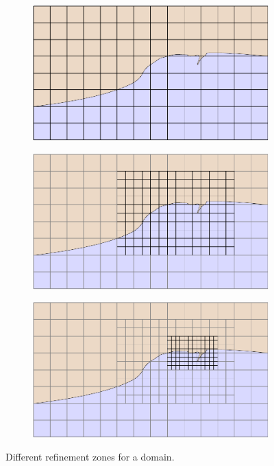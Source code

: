 \begin{figure}
\centering
\begin{subfigure}{.8\textwidth}
    \includegraphics[width=\textwidth]{img/multigrid/grid1.pdf}
    \vspace{1em}
\end{subfigure}
\begin{subfigure}{.8\textwidth}
    \includegraphics[width=\textwidth]{img/multigrid/grid2.pdf}
    \vspace{1em}
\end{subfigure}
\begin{subfigure}{.8\textwidth}
    \includegraphics[width=\textwidth]{img/multigrid/grid3.pdf}
    \vspace{1em}
\end{subfigure}
\caption{Different refinement zones for a domain.}
\end{figure}

